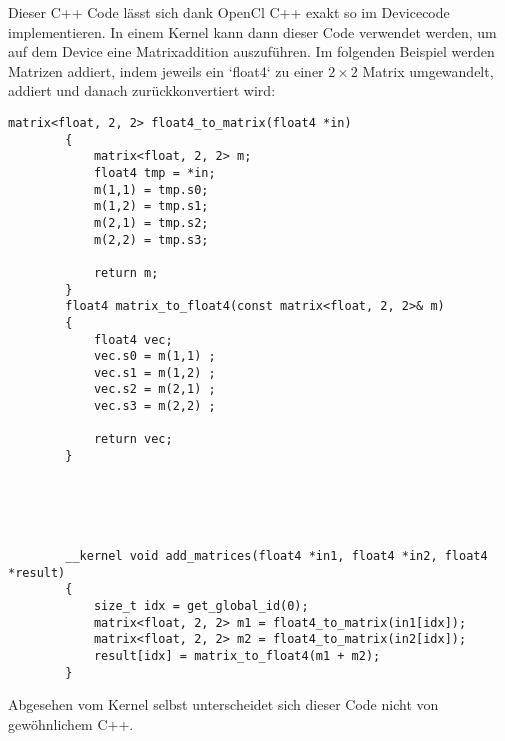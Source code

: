 		Dieser C++ Code lässt sich dank OpenCl C++ exakt so im Devicecode implementieren. In einem \Gls{Kernel} kann dann dieser Code verwendet werden, um auf dem Device eine Matrixaddition auszuführen. Im folgenden Beispiel werden Matrizen addiert, indem jeweils ein \li`float4` zu einer $2\times 2$ Matrix umgewandelt, addiert und danach zurückkonvertiert wird:	
		\begin{lstlisting}[caption=~OpenCl C++ Kernel]
		matrix<float, 2, 2> float4_to_matrix(float4 *in) 
		{
			matrix<float, 2, 2> m;
			float4 tmp = *in;
			m(1,1) = tmp.s0;
			m(1,2) = tmp.s1;
			m(2,1) = tmp.s2;
			m(2,2) = tmp.s3;
			
			return m;
		}
		float4 matrix_to_float4(const matrix<float, 2, 2>& m)
		{
			float4 vec;
			vec.s0 = m(1,1) ;
			vec.s1 = m(1,2) ;
			vec.s2 = m(2,1) ;
			vec.s3 = m(2,2) ;

			return vec;
		}





		__kernel void add_matrices(float4 *in1, float4 *in2, float4 *result) 
		{
			size_t idx = get_global_id(0);
			matrix<float, 2, 2> m1 = float4_to_matrix(in1[idx]);
			matrix<float, 2, 2> m2 = float4_to_matrix(in2[idx]);
			result[idx] = matrix_to_float4(m1 + m2);
		}
		\end{lstlisting}
		
		Abgesehen vom \Gls{Kernel} selbst unterscheidet sich dieser Code nicht von gewöhnlichem C++.
